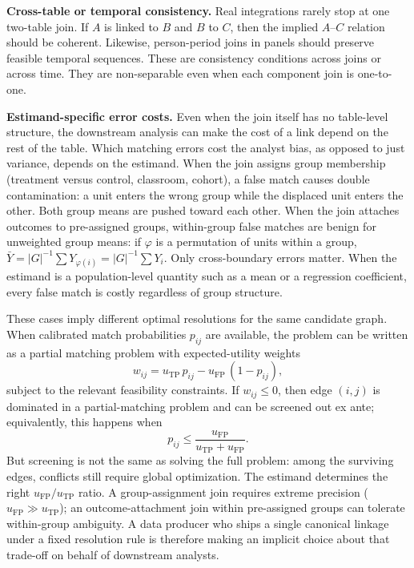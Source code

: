 \documentclass[11pt]{article}
\theoremstyle{remark}
\begin{document}
\textbf{Cross-table or temporal consistency.} Real integrations rarely stop at one two-table join. If $A$ is linked to $B$ and $B$ to $C$, then the implied $A$--$C$ relation should be coherent. Likewise, person-period joins in panels should preserve feasible temporal sequences. These are consistency conditions across joins or across time. They are non-separable even when each component join is one-to-one.

\textbf{Estimand-specific error costs.} Even when the join itself has no table-level structure, the downstream analysis can make the cost of a link depend on the rest of the table. Which matching errors cost the analyst bias, as opposed to just variance, depends on the estimand. When the join assigns group membership (treatment versus control, classroom, cohort), a false match causes double contamination: a unit enters the wrong group while the displaced unit enters the other. Both group means are pushed toward each other. When the join attaches outcomes to pre-assigned groups, within-group false matches are benign for unweighted group means: if $\varphi$ is a permutation of units within a group, $\bar Y = |G|^{-1}\sum Y_{\varphi(i)} = |G|^{-1}\sum Y_i$. Only cross-boundary errors matter. When the estimand is a population-level quantity such as a mean or a regression coefficient, every false match is costly regardless of group structure.

These cases imply different optimal resolutions for the same candidate graph. When calibrated match probabilities $p_{ij}$ are available, the problem can be written as a partial matching problem with expected-utility weights
\begin{equation}
w_{ij}=u_{\mathrm{TP}}\,p_{ij}-u_{\mathrm{FP}}\,(1-p_{ij}),
\label{eq:decision}
\end{equation}
subject to the relevant feasibility constraints. If $w_{ij}\le 0$, then edge $(i,j)$ is dominated in a partial-matching problem and can be screened out ex ante; equivalently, this happens when
\[
p_{ij}\le \frac{u_{\mathrm{FP}}}{u_{\mathrm{TP}}+u_{\mathrm{FP}}}.
\]
But screening is not the same as solving the full problem: among the surviving edges, conflicts still require global optimization. The estimand determines the right $u_{\mathrm{FP}}/u_{\mathrm{TP}}$ ratio. A group-assignment join requires extreme precision ($u_{\mathrm{FP}}\gg u_{\mathrm{TP}}$); an outcome-attachment join within pre-assigned groups can tolerate within-group ambiguity. A data producer who ships a single canonical linkage under a fixed resolution rule is therefore making an implicit choice about that trade-off on behalf of downstream analysts.
\end{document}
